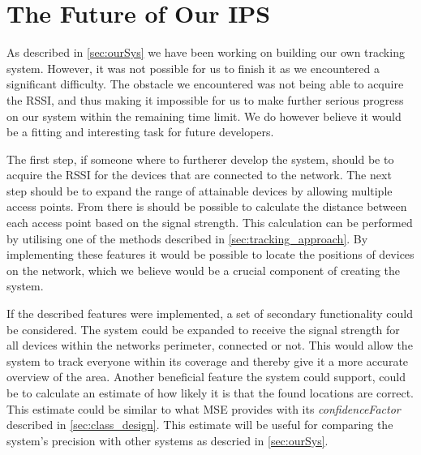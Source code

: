 \section{The Future of Our IPS}\label{sec:futureSystem}
As described in \cref{sec:ourSys} we have been working on building our own tracking system. However, it was not possible for us to finish it as we encountered a significant difficulty. The obstacle we encountered was not being able to acquire the RSSI, and thus making it impossible for us to make further serious progress on our system within the remaining time limit. We do however believe it would be a fitting and interesting task for future developers.

The first step, if someone where to furtherer develop the system, should be to acquire the RSSI for the devices that are connected to the network. The next step should be to expand the range of attainable devices by allowing multiple access points. From there is should be possible to calculate the distance between each access point based on the signal strength. This calculation can be performed by utilising one of the methods described in \cref{sec:tracking_approach}. By implementing these features it would be possible to locate the positions of devices on the network, which we believe would be a crucial component of creating the system.

If the described features were implemented, a set of secondary functionality could be considered. The system could be expanded to receive the signal strength for all devices within the networks perimeter, connected or not. This would allow the system to track everyone within its coverage and thereby give it a more accurate overview of the area.
Another beneficial feature the system could support, could be to calculate an estimate of how likely it is that the found locations are correct. This estimate could be similar to what MSE provides with its \textit{confidenceFactor} described in \cref{sec:class_design}. This estimate will be useful for comparing the system's precision with other systems as descried in \cref{sec:ourSys}.